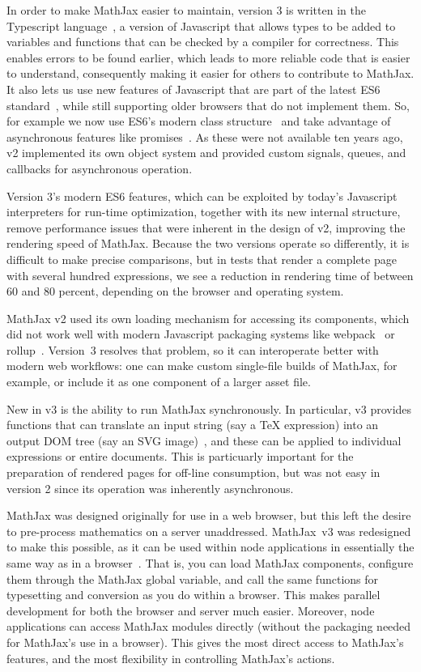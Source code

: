 \documentclass{article}
\begin{document}
In order to make MathJax easier to maintain, version 3 is written in the
Typescript language~\cite{Typescript}, a version of Javascript that allows
types to be added to variables and functions that can be checked by a compiler for
correctness.  This enables errors to be found earlier, which leads to more
reliable code that is easier to understand, consequently making it easier for
others to contribute to MathJax.  It also lets us use new features of
Javascript that are part of the latest ES6 standard~\cite{ES6}, while still
supporting older browsers that do not implement them.
So, for example we now use ES6's modern class structure~\cite{ES6-class}
and take advantage of asynchronous features like promises~\cite{ES6-promise}.
As these were not available ten years ago, v2 implemented its
own object system and provided custom signals, queues, and callbacks
for asynchronous operation.

Version 3's modern ES6 features, which can be exploited by today's Javascript
interpreters for run-time optimization, together with its new internal
structure, remove performance issues that were inherent in the
design of v2, improving the rendering speed of MathJax.  Because the
two versions operate so differently, it is difficult to make precise
comparisons, but in tests that render a complete page with several
hundred expressions, we see a reduction in rendering time of between
60 and 80 percent, depending on the browser and operating system.

MathJax v2 used its own loading mechanism for accessing its
components, which did not work well with modern Javascript packaging
systems like webpack~\cite{webpack} or rollup~\cite{rollup}.  Version~3
resolves that problem, so it can interoperate better with modern web
workflows: one can make custom single-file builds of MathJax, for example, or
include it as one component of a larger asset file.

New in v3 is the ability to run MathJax synchronously. In
particular, v3 provides functions that can translate an input string
(say a TeX expression) into an output DOM tree (say an SVG
image)~\cite{MJ-convert}, and these can be applied to individual
expressions or entire documents.  This is particuarly important for
the preparation of rendered pages for off-line consumption, but was
not easy in version 2 since its operation was inherently asynchronous.

MathJax was designed originally for use in a web browser, but this
left the desire to pre-process mathematics on a
server unaddressed. MathJax~v3 was redesigned to make this possible, as it can be
used within node applications in essentially the same way as in a
browser~\cite{MJ-web, MJ-node}. That is, you can load MathJax
components, configure them through the MathJax global variable, and
call the same functions for typesetting and conversion as you do
within a browser. This makes parallel development for both the browser
and server much easier.  Moreover, node applications can access
MathJax modules directly (without the packaging needed for MathJax's
use in a browser). This gives the most direct access to MathJax’s
features, and the most flexibility in controlling MathJax’s actions.
\end{document}
